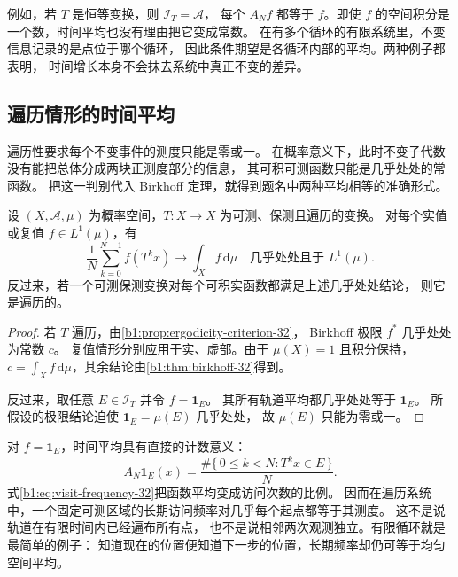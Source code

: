 例如，若 \(T\) 是恒等变换，则 \(\mathcal I_T=\mathcal A\)，
每个 \(A_Nf\) 都等于 \(f\)。即使 \(f\) 的空间积分是一个数，时间平均也没有理由把它变成常数。
在有多个循环的有限系统里，不变信息记录的是点位于哪个循环，
因此条件期望是各循环内部的平均。两种例子都表明，
时间增长本身不会抹去系统中真正不变的差异。

\subsection{遍历情形的时间平均}
\label{b1:subsec:320403}

遍历性要求每个不变事件的测度只能是零或一。
在概率意义下，此时不变子代数没有能把总体分成两块正测度部分的信息，
其可积可测函数只能是几乎处处的常函数。
把这一判别代入 Birkhoff 定理，就得到题名中两种平均相等的准确形式。

\begin{corollary}[遍历系统的时间平均]
\label{b1:cor:ergodic-time-space-32}
设 \((X,\mathcal A,\mu)\) 为概率空间，\(T:X\to X\) 为可测、保测且遍历的变换。
对每个实值或复值 \(f\in L^1(\mu)\)，有
\[
 \frac1N\sum_{k=0}^{N-1}f(T^kx)
 \longrightarrow\int_Xf\,\mathrm d\mu
 \quad\text{几乎处处且于 }L^1(\mu).
\]
反过来，若一个可测保测变换对每个可积实函数都满足上述几乎处处结论，
则它是遍历的。
\end{corollary}
\begin{proof}
若 \(T\) 遍历，由\cref{b1:prop:ergodicity-criterion-32}，
Birkhoff 极限 \(f^*\) 几乎处处为常数 \(c\)。
复值情形分别应用于实、虚部。由于 \(\mu(X)=1\) 且积分保持，
\(c=\int_Xf\,\mathrm d\mu\)，其余结论由\cref{b1:thm:birkhoff-32}得到。

反过来，取任意 \(E\in\mathcal I_T\) 并令 \(f=\mathbf1_E\)。
其所有轨道平均都几乎处处等于 \(\mathbf1_E\)。
所假设的极限结论迫使 \(\mathbf1_E=\mu(E)\) 几乎处处，
故 \(\mu(E)\) 只能为零或一。
\end{proof}

对 \(f=\mathbf1_E\)，时间平均具有直接的计数意义：
\begin{equation}
 A_N\mathbf1_E(x)
 =\frac{\#\{\,0\leq k<N:T^kx\in E\,\}}N.
 \label{b1:eq:visit-frequency-32}
\end{equation}
式\eqref{b1:eq:visit-frequency-32}把函数平均变成访问次数的比例。
因而在遍历系统中，一个固定可测区域的长期访问频率对几乎每个起点都等于其测度。
这不是说轨道在有限时间内已经遍布所有点，
也不是说相邻两次观测独立。有限循环就是最简单的例子：
知道现在的位置便知道下一步的位置，长期频率却仍可等于均匀空间平均。

\ProseParagraphBreak

